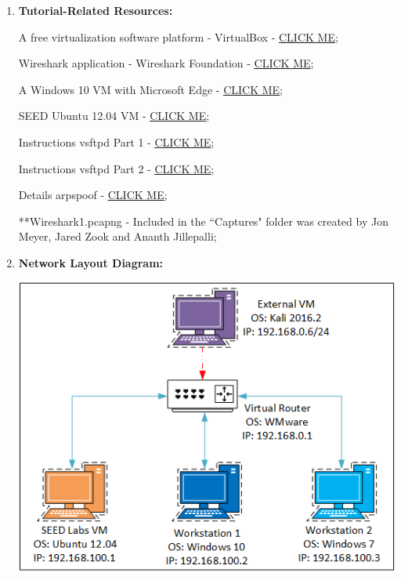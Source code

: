 \documentclass[12pt]{extarticle}
\begin{document}
	\begin{enumerate}
		\item \textbf{Tutorial-Related Resources:}
		\label{SoftwareResourceLocations}
		
		A free virtualization software platform - VirtualBox - \href{https://www.virtualbox.org/wiki/Downloads}{\underline{CLICK ME}};
		
		Wireshark application - Wireshark Foundation - \href{https://www.wireshark.org/}{\underline{CLICK ME}};
		
		A Windows 10 VM with Microsoft Edge - \href{https://developer.microsoft.com/en-us/microsoft-edge/tools/vms/}{\underline{CLICK ME}};
		
		SEED Ubuntu 12.04 VM - \href{http://www.cis.syr.edu/~wedu/seed/lab_env.html}{\underline{CLICK ME}};
		
		Instructions vsftpd Part 1 - \href{https://help.ubuntu.com/lts/serverguide/ftp-server.html}{\underline{CLICK ME}};
		
		Instructions vsftpd Part 2 - \href{https://help.ubuntu.com/community/vsftpd}{\underline{CLICK ME}};
		
		Details arpspoof - \href{https://packages.debian.org/wheezy/net/dsniff}{\underline{CLICK ME}};
		
		**Wireshark1.pcapng - Included in the ``Captures" folder was created by Jon Meyer, Jared Zook and Ananth Jillepalli;
		
		
		\item \textbf{Network Layout Diagram:}
		\label{NetworkLayoutDiagram}
		
		\begin{center}
			\includegraphics{NetworkDiagram.png}
		\end{center}
		

\end{enumerate}
\end{document}
